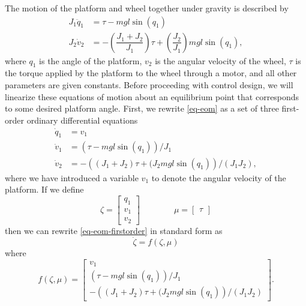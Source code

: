 \documentclass[conf]{new-aiaa}
\begin{document}
The motion of the platform and wheel together under gravity is described by
\begin{equation}
\begin{aligned}
J_1 \ddot{q}_1 &= \tau - mgl\sin(q_1) \\
J_2 \dot{v}_2 &= - \left( \dfrac{J_1 + J_2}{J_1} \right) \tau + \left( \dfrac{J_2}{J_1} \right) mgl\sin(q_1),
\end{aligned}
\label{eq-eom}
\end{equation}
where $q_{1}$ is the angle of the platform, $v_{2}$ is the angular velocity of the wheel, $\tau$ is the torque applied by the platform to the wheel through a motor, and all other parameters are given constants.
Before proceeding with control design, we will linearize these equations of motion about an equilibrium point that corresponds to some desired platform angle.
First, we rewrite \eqref{eq-eom} as a set of three first-order ordinary differential equations
\begin{equation}
\begin{aligned}
\dot{q}_{1} &= v_{1} \\
\dot{v}_{1} &= \left( \tau - mgl\sin(q_1) \right) / J_{1} \\
\dot{v}_{2} &= - \left( (J_1 + J_2) \tau + ( J_{2} mgl\sin(q_1) \right) / (J_{1}J_{2}),
\end{aligned}
\label{eq-eom-firstorder}
\end{equation}
where we have introduced a variable $v_{1}$ to denote the angular velocity of the platform. If we define
\begin{equation}
\zeta = \begin{bmatrix} q_{1} \\ v_{1} \\ v_{2} \end{bmatrix}
\qquad\qquad
\mu = \begin{bmatrix} \tau \end{bmatrix}
\end{equation}
then we can rewrite \eqref{eq-eom-firstorder} in standard form as
\begin{equation}
\dot{\zeta} = f(\zeta, \mu)
\label{eq-eom-general}
\end{equation}
where
\begin{equation}
f(\zeta, \mu) =
\begin{bmatrix}
v_{1} \\
\left( \tau - mgl\sin(q_1) \right) / J_{1} \\
- \left( (J_1 + J_2) \tau + ( J_{2} mgl\sin(q_1) \right) / (J_{1}J_{2})
\end{bmatrix}.
\end{equation}
\end{document}
